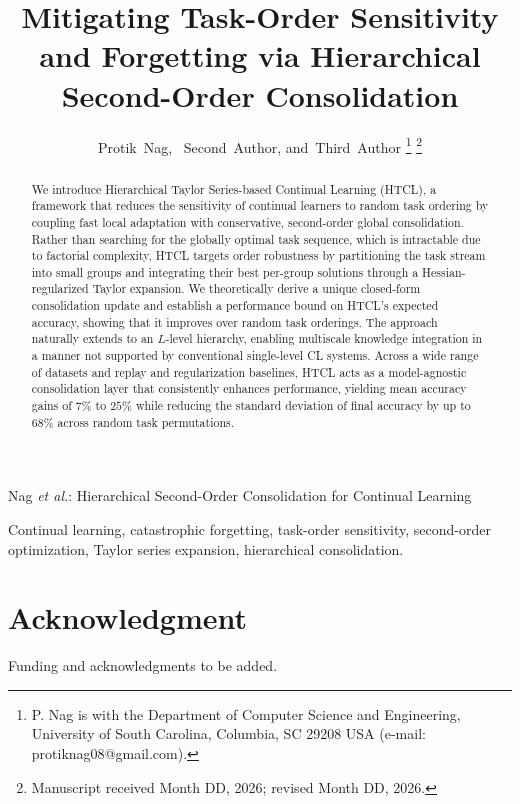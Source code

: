 \documentclass[journal]{IEEEtran}
\theoremstyle{plain}
\theoremstyle{definition}
\theoremstyle{remark}
\begin{document}
\title{Mitigating Task-Order Sensitivity and Forgetting via Hierarchical Second-Order Consolidation}

\author{Protik~Nag,~
        Second~Author,
        and~Third~Author%
\thanks{P. Nag is with the Department of Computer Science and Engineering, University of South Carolina, Columbia, SC 29208 USA (e-mail: protiknag08@gmail.com).}%
\thanks{Manuscript received Month DD, 2026; revised Month DD, 2026.}}

%
{Nag \MakeLowercase{\textit{et al.}}: Hierarchical Second-Order Consolidation for Continual Learning}

\maketitle

\begin{abstract}
We introduce Hierarchical Taylor Series-based Continual Learning (HTCL), a framework that reduces the sensitivity of continual learners to random task ordering by coupling fast local adaptation with conservative, second-order global consolidation. Rather than searching for the globally optimal task sequence, which is intractable due to factorial complexity, HTCL targets order robustness by partitioning the task stream into small groups and integrating their best per-group solutions through a Hessian-regularized Taylor expansion. We theoretically derive a unique closed-form consolidation update and establish a performance bound on HTCL's expected accuracy, showing that it improves over random task orderings. The approach naturally extends to an $L$-level hierarchy, enabling multiscale knowledge integration in a manner not supported by conventional single-level CL systems. Across a wide range of datasets and replay and regularization baselines, HTCL acts as a model-agnostic consolidation layer that consistently enhances performance, yielding mean accuracy gains of $7\%$ to $25\%$ while reducing the standard deviation of final accuracy by up to $68\%$ across random task permutations.
\end{abstract}

\begin{IEEEkeywords}
Continual learning, catastrophic forgetting, task-order sensitivity, second-order optimization, Taylor series expansion, hierarchical consolidation.
\end{IEEEkeywords}







\appendices


\section*{Acknowledgment}
Funding and acknowledgments to be added.



\end{document}
